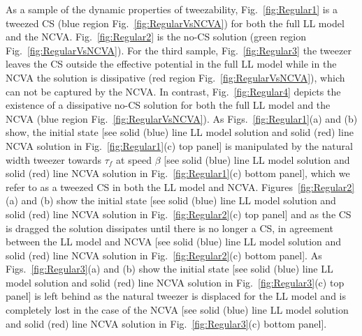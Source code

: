 As a sample of the dynamic properties of tweezability, Fig.~\ref{fig:Regular1} is a tweezed CS (blue region Fig.~\ref{fig:RegularVsNCVA}) for both the full LL model and the NCVA.  Fig.~\ref{fig:Regular2} is the no-CS solution  (green region Fig.~\ref{fig:RegularVsNCVA}).  For the third sample, Fig.~\ref{fig:Regular3} the tweezer leaves the CS outside the effective potential in the full LL model while in the NCVA the solution is dissipative (red region Fig.~\ref{fig:RegularVsNCVA}), which can not be captured by the NCVA.  In contrast, Fig.~\ref{fig:Regular4} depicts the existence of a dissipative no-CS solution for both the full LL model and the NCVA (blue region Fig.~\ref{fig:RegularVsNCVA}).  As Figs.~\ref{fig:Regular1}(a) and (b) show, the initial state [see solid (blue) line LL model solution and solid (red) line NCVA solution in Fig.~\ref{fig:Regular1}(c) top panel] is manipulated by the natural width tweezer towards $\tau_f$ at speed $\beta$ [see solid (blue) line LL model solution  and solid (red) line NCVA solution in Fig.~\ref{fig:Regular1}(c) bottom panel], which we refer to as a tweezed CS in both the LL model and NCVA.  Figures~\ref{fig:Regular2}(a) and (b) show the initial state [see solid (blue) line LL model solution and solid (red) line NCVA solution in Fig.~\ref{fig:Regular2}(c) top panel] and as the CS is dragged the solution dissipates until there is no longer a CS, in agreement between the LL model and NCVA  [see solid (blue) line LL model solution and solid (red) line NCVA solution in Fig.~\ref{fig:Regular2}(c) bottom panel].   As Figs.~\ref{fig:Regular3}(a) and (b) show the initial state [see solid (blue) line LL model solution and solid (red) line NCVA solution in Fig.~\ref{fig:Regular3}(c) top panel] is left behind as the natural tweezer is displaced for the LL model and is completely lost in the case of the NCVA  [see solid (blue) line LL model solution  and solid (red) line NCVA solution in Fig.~\ref{fig:Regular3}(c) bottom panel].  



